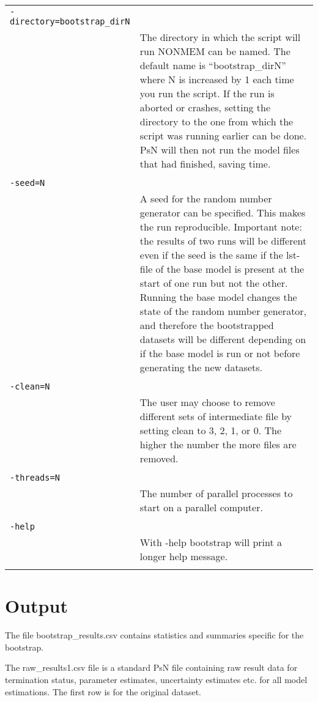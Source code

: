 \documentclass[a4paper,12pt]{article}
\begin{document}
\begin{longtable}{p{1in}p{4in}}
\verb|-directory=bootstrap_dirN| & \\
\nopagebreak
 & The directory in which the script will run NONMEM can be named. The default name is “bootstrap\_dirN” where N is increased by 1 each time you run the script. If the run is aborted or crashes, setting the directory to the one from which the script was running earlier can be done. PsN will then not run the model files that had finished, saving time. \\
\\
\verb|-seed=N| & \\
\nopagebreak
 & A seed for the random number generator can be specified. This makes the run reproducible. Important note: the results of two runs will be different even if the seed is the same if the lst-file of the base model is present at the start of one run but not the other. Running the base model changes the state of the random number generator, and therefore the bootstrapped datasets will be different depending on if the base model is run or not before generating the  new datasets. \\
\\
\verb|-clean=N| & \\
\nopagebreak
 & The user may choose to remove different sets of intermediate file by setting clean to 3, 2, 1, or 0. The higher the number the more files are removed. \\
\\
\verb|-threads=N| & \\
\nopagebreak
 & The number of parallel processes to start on a parallel computer. \\
\\
\verb|-help| & \\
\nopagebreak
 & With -help bootstrap will print a longer help message. \\
\\
\end{longtable}


\section{Output}

The file bootstrap\_results.csv contains statistics and summaries specific for the bootstrap.

The raw\_results1.csv file is a standard PsN file containing raw result data for termination status, parameter estimates, uncertainty estimates etc. for all model estimations. The first row is for the original dataset. 
\end{document}

